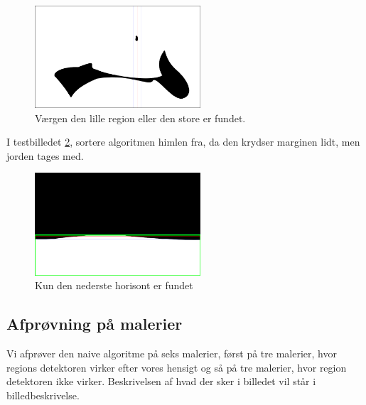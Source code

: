\begin{figure}[!h]
	\begin{center}
       	\includegraphics[angle=0,width=0.55\textwidth]{afsnit/afprovning/billeder/naive_losning/naiv_blob2.png}
	\end{center}
	\caption{Værgen den lille region eller den store er fundet.} 
   	\label{naiv_blob2}
\end{figure}

I testbilledet \ref{naive_hoisont1}, sortere algoritmen
himlen fra, da den krydser marginen lidt, men jorden tages med. 

\begin{figure}[!h]
	\begin{center}
       	\includegraphics[angle=0,width=0.55\textwidth]{afsnit/afprovning/billeder/naive_losning/naiv_hoisont1.png}
	\end{center}
	\caption{Kun den nederste horisont er fundet} 
   	\label{naive_hoisont1}
\end{figure}

\clearpage

\subsection{Afprøvning på malerier}
Vi afprøver den naive algoritme på seks malerier, først på tre malerier,
hvor regions detektoren virker efter vores hensigt og så på tre
malerier, hvor region detektoren ikke virker. Beskrivelsen af hvad der
sker i billedet vil står i billedbeskrivelse.


